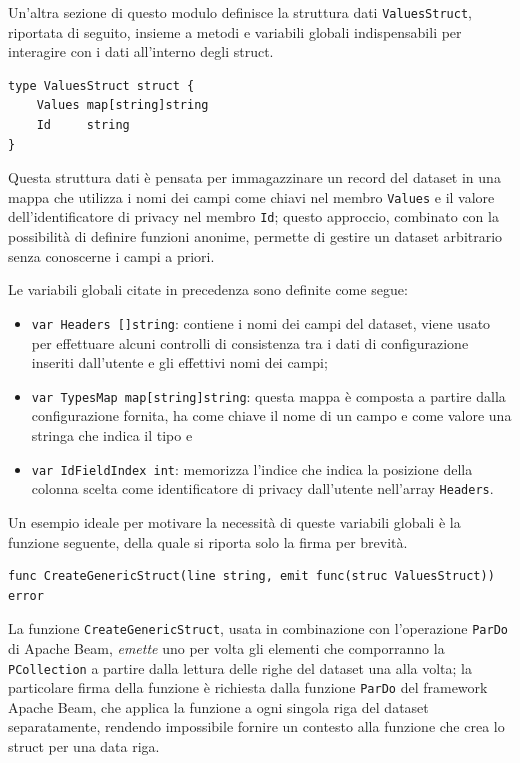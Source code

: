 Un'altra sezione di questo modulo definisce la struttura dati \texttt{ValuesStruct}, riportata di seguito, insieme a metodi e variabili globali indispensabili per interagire con i dati all'interno degli struct.
\begin{verbatim}
type ValuesStruct struct {
	Values map[string]string
	Id     string
}
\end{verbatim}
Questa struttura dati è pensata per immagazzinare un record del dataset in una mappa che utilizza i nomi dei campi come chiavi nel membro \texttt{Values} e il valore dell'identificatore di privacy nel membro \texttt{Id}; questo approccio, combinato con la possibilità di definire funzioni anonime, permette di gestire un dataset arbitrario senza conoscerne i campi a priori.

Le variabili globali citate in precedenza sono definite come segue:
\begin{itemize}
    \item \texttt{var Headers []string}: contiene i nomi dei campi del dataset, viene usato per effettuare alcuni controlli di consistenza tra i dati di configurazione inseriti dall'utente e gli effettivi nomi dei campi;
    \item \texttt{var TypesMap map[string]string}: questa mappa è composta a partire dalla configurazione fornita, ha come chiave il nome di un campo e come valore una stringa che indica il tipo e
    \item \texttt{var IdFieldIndex int}: memorizza l'indice che indica la posizione della colonna scelta come identificatore di privacy dall'utente nell'array \texttt{Headers}.
\end{itemize}

Un esempio ideale per motivare la necessità di queste variabili globali è la funzione seguente, della quale si riporta solo la firma per brevità.

\begin{verbatim}
func CreateGenericStruct(line string, emit func(struc ValuesStruct)) error
\end{verbatim}
La funzione \texttt{CreateGenericStruct}, usata in combinazione con l'operazione \texttt{ParDo} di Apache Beam, \textit{emette} uno per volta gli elementi che comporranno la \texttt{PCollection} a partire dalla lettura delle righe del dataset una alla volta; la particolare firma della funzione è richiesta dalla funzione \texttt{ParDo} del framework Apache Beam, che applica la funzione a ogni singola riga del dataset separatamente, rendendo impossibile fornire un contesto alla funzione che crea lo struct per una data riga.

